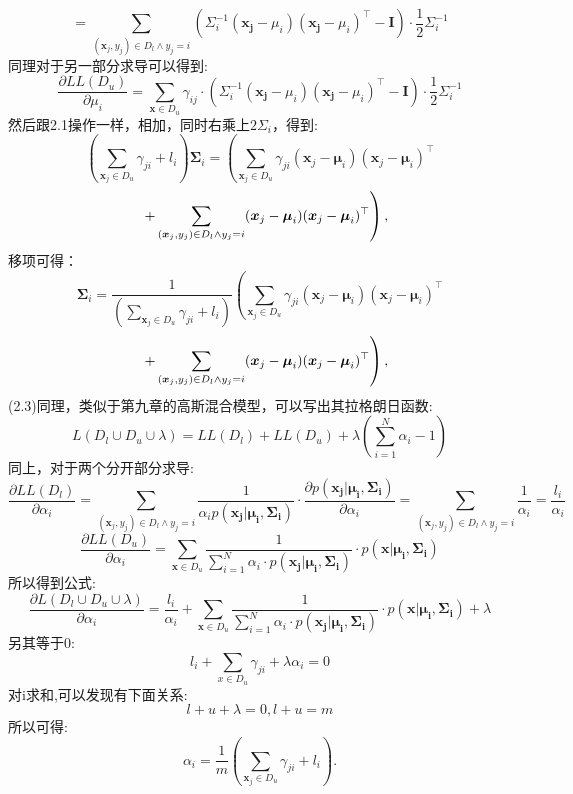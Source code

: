 \documentclass[answers]{exam}  %
\begin{document}
\begin{questions}
\begin{solution}
\begin{parts}
\[    \]
    \[
        = \sum_{(\boldsymbol{x}_j, y_j) \in D_l \wedge y_j = i} (\Sigma_i^{-1} (\boldsymbol{x_j} - \mu_i)(\boldsymbol{x_j} - \mu_i)^\top - \boldsymbol{I})\cdot\frac{1}{2}\Sigma_i^{-1}
    \]
    同理对于另一部分求导可以得到:\\
    \[
        \frac{\partial LL(D_u)}{\partial \mu_i} = \sum_{\boldsymbol{x}\in D_u} \gamma_{ij} \cdot(\Sigma_i^{-1}(\boldsymbol{x_j} - \mu_i)(\boldsymbol{x_j} - \mu_i)^\top - \boldsymbol{I})\cdot\frac{1}{2}\Sigma_i^{-1}
    \]
    然后跟2.1操作一样，相加，同时右乘上$2\Sigma_i$，得到:
    \[
        (\sum_{\boldsymbol{x}_j \in D_u} \gamma_{ji} + l_i)\boldsymbol{\Sigma}_i = \left( \sum_{\boldsymbol{x}_j \in D_u} \gamma_{ji} (\boldsymbol{x}_j - \boldsymbol{\mu}_i)(\boldsymbol{x}_j - \boldsymbol{\mu}_i)^\top \right.
    \]
    \[
        \quad \left. + \sum_{(\boldsymbol{x}_j, y_j) \in D_l \land y_j = i} (\boldsymbol{x}_j - \boldsymbol{\mu}_i)(\boldsymbol{x}_j - \boldsymbol{\mu}_i)^\top \right) , \\
    \]
    移项可得：
    \[
        \boldsymbol{\Sigma}_i = \frac{1}{(\sum_{\boldsymbol{x}_j \in D_u} \gamma_{ji} + l_i)}\left( \sum_{\boldsymbol{x}_j \in D_u} \gamma_{ji} (\boldsymbol{x}_j - \boldsymbol{\mu}_i)(\boldsymbol{x}_j - \boldsymbol{\mu}_i)^\top \right.
    \]
    \[
        \quad \left. + \sum_{(\boldsymbol{x}_j, y_j) \in D_l \land y_j = i} (\boldsymbol{x}_j - \boldsymbol{\mu}_i)(\boldsymbol{x}_j - \boldsymbol{\mu}_i)^\top \right) , \\
    \]
    (2.3)同理，类似于第九章的高斯混合模型，可以写出其拉格朗日函数:
    \[
        L(D_l \cup D_u \cup \lambda) = LL(D_l) + LL(D_u) + \lambda(\sum_{i=1}^{N} \alpha_i - 1) 
    \]
    同上，对于两个分开部分求导:
    \[
        \frac{\partial LL(D_l)}{\partial \alpha_i}  = \sum_{(\boldsymbol{x}_j, y_j) \in D_l \wedge y_j = i}\frac{1}{\alpha_i p(\boldsymbol{x_j}|\boldsymbol{\mu_i}, \boldsymbol{\Sigma_i})}\cdot\frac{\partial p(\boldsymbol{x_j}|\boldsymbol{\mu_i}, \boldsymbol{\Sigma_i})}{\partial\alpha_i} = \sum_{(\boldsymbol{x}_j, y_j) \in D_l \wedge y_j = i} \frac{1}{\alpha_i} = \frac{l_i}{\alpha_i}
    \]
    \[
        \frac{\partial LL(D_u)}{\partial \alpha_i}  = \sum_{\boldsymbol{x}\in D_u} \frac{1}{\sum_{i=1}^{N} \alpha_i \cdot p(\boldsymbol{x_j}|\boldsymbol{\mu_i}, \boldsymbol{\Sigma_i})} \cdot p(\boldsymbol{x}|\boldsymbol{\mu_i}, \boldsymbol{\Sigma_i})
    \]
    所以得到公式:
    \[
        \frac{\partial L(D_l \cup D_u \cup \lambda)}{\partial \alpha_i} = \frac{l_i}{\alpha_i} + \sum_{\boldsymbol{x}\in D_u} \frac{1}{\sum_{i=1}^{N} \alpha_i \cdot p(\boldsymbol{x_j}|\boldsymbol{\mu_i}, \boldsymbol{\Sigma_i})} \cdot p(\boldsymbol{x}|\boldsymbol{\mu_i}, \boldsymbol{\Sigma_i}) + \lambda
    \]
    另其等于0:
    \[  
        l_i + \sum_{x \in D_u} \gamma_{ji} + \lambda \alpha_i = 0
    \]
    对i求和,可以发现有下面关系:
    \[
        l + u + \lambda = 0 ,l + u = m
    \]
    所以可得:
    \[
        \alpha_i = \frac{1}{m} \left( \sum_{\boldsymbol{x}_j \in D_u} \gamma_{ji} + l_i \right) . 
    \]


\end{parts}
\end{solution}
\end{questions}
\end{document}
